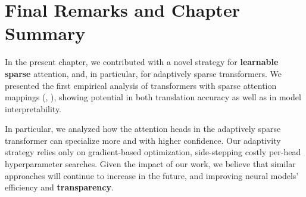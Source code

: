 \section{Final Remarks and Chapter Summary}

In the present chapter, we contributed with a novel strategy for
\textbf{learnable sparse} attention, and, in particular, for adaptively
sparse transformers. We presented the first empirical analysis of
transformers with sparse attention mappings (\ie, \entmaxtext),
showing potential in both translation accuracy as well as in model
interpretability.

In particular, we analyzed how the attention heads in the adaptively
sparse transformer can specialize more and with higher confidence.
Our adaptivity strategy relies only on gradient-based optimization,
side-stepping costly per-head hyperparameter searches. Given the
impact of our work, we believe that similar approaches will continue
to increase in the future, and improving neural
models' efficiency and \textbf{transparency}.

\cleardoublepage

\singlespacing